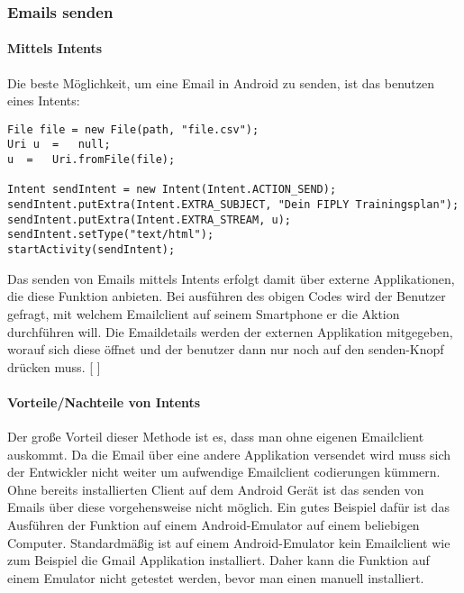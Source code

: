 \documentclass[FIPLY_base.tex]{subfiles}
\begin{document}
\subsubsection{Emails senden}
\paragraph{Mittels Intents}
Die beste Möglichkeit, um eine Email in Android zu senden, ist das benutzen eines Intents:
\begin{lstlisting}[caption={Verwendung von CSVWriter: Möglichkeit 2, alles auf einmal},label=DescriptiveLabel]
File file = new File(path, "file.csv");
Uri u  =   null;
u  =   Uri.fromFile(file);

Intent sendIntent = new Intent(Intent.ACTION_SEND);
sendIntent.putExtra(Intent.EXTRA_SUBJECT, "Dein FIPLY Trainingsplan");
sendIntent.putExtra(Intent.EXTRA_STREAM, u);
sendIntent.setType("text/html");
startActivity(sendIntent);
\end{lstlisting}
Das senden von Emails mittels Intents erfolgt damit über externe Applikationen, die diese Funktion anbieten. Bei ausführen des obigen Codes wird der Benutzer gefragt, mit welchem Emailclient auf seinem Smartphone er die Aktion durchführen will. Die Emaildetails werden der externen Applikation mitgegeben, worauf sich diese öffnet und der benutzer dann nur noch auf den \grqq{}senden\grqq{}-Knopf drücken muss. [ \cite{exportCSVsendMail}]
\paragraph{Vorteile/Nachteile von Intents}
Der große Vorteil dieser Methode ist es, dass man ohne eigenen Emailclient auskommt. Da die Email über eine andere Applikation versendet wird muss sich der Entwickler nicht weiter um aufwendige Emailclient codierungen kümmern. 
\ \\
Ohne bereits installierten Client auf dem Android Gerät ist das senden von Emails über diese vorgehensweise nicht möglich. Ein gutes Beispiel dafür ist das Ausführen der Funktion auf einem Android-Emulator auf einem beliebigen Computer. Standardmäßig ist auf einem Android-Emulator kein Emailclient wie zum Beispiel die Gmail Applikation installiert. Daher kann die Funktion auf einem Emulator nicht getestet werden, bevor man einen manuell installiert. 
\ \\
\end{document}

